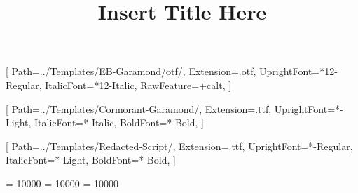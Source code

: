 \title{Insert Title Here}


\usepackage[
  papersize={8.5in,11in},
  margin = 0.55in,
  bindingoffset = 0.7in, %
  footskip=.5cm,
  nohead
]{geometry}

\usepackage[
  noinfo,
  width=8.625in, %
  height=11.25in, %
  off,
  center
]{crop}

\newcommand{\custompaperwidth}{8.75in}
\newcommand{\custompaperheight}{11.25in}

\usepackage{setspace}
\usepackage[skip=15pt plus1pt, indent=0pt]{parskip} %

\setmainfont{EBGaramond}[
  Path=../Templates/EB-Garamond/otf/,
  Extension=.otf,
  UprightFont=*12-Regular,
  ItalicFont=*12-Italic,
  RawFeature=+calt,
]

\newfontfamily{}[
  Path=../Templates/Cormorant-Garamond/,
  Extension=.ttf,
  UprightFont=*-Light,
  ItalicFont=*-Italic,
  BoldFont=*-Bold,
]

\newfontfamily{}[
  Path=../Templates/Redacted-Script/,
  Extension=.ttf,
  UprightFont=*-Regular,
  ItalicFont=*-Light,
  BoldFont=*-Bold,
]


\usepackage{float}
\usepackage{tabulary}
\usepackage{booktabs} %
\clubpenalty = 10000 
\widowpenalty = 10000
\displaywidowpenalty = 10000

\newcommand{\HUGE}{\fontsize{36}{36}\selectfont}
\newcommand{\HUGEST}{\fontsize{42}{42}\selectfont}
\newcommand{\BIG}{\fontsize{48}{48}\selectfont}
\newcommand{\BIGPARTFONT}{\fontsize{72}{72}\selectfont}

\newcommand{\sectionsubtitle}[1]{\begin{center}%
\vspace*{-0.6in}\fontsize{26}{26}\itshape{#1}\vspace*{0.3in}%
\end{center}}

